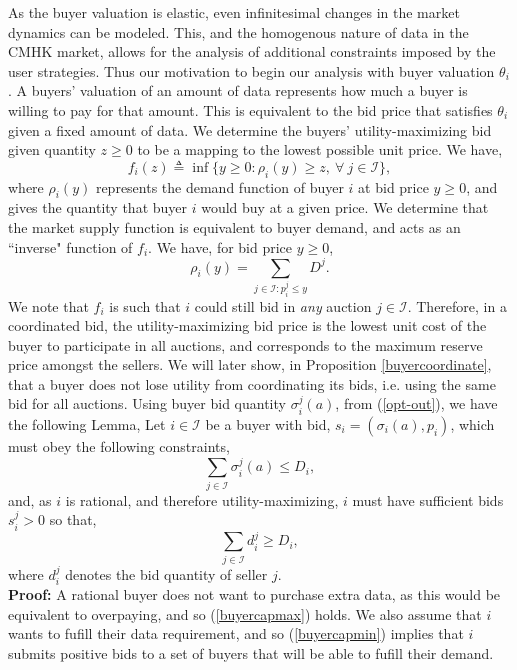 \documentclass[12pt]{article}
\theoremstyle{definition}
\newcommand{\mcI}{\mathcal{I}}
\newcommand{\g}{\sigma}
\begin{document}
\begin{multicols}{2}
As the buyer valuation is elastic, even infinitesimal changes in the market dynamics can be
modeled. This, and the homogenous nature of data in the CMHK market, 
allows for the analysis of additional constraints imposed by the user
strategies. Thus our motivation to begin our analysis with buyer valuation $\theta_i$.
A buyers' valuation of an amount of data represents how much a buyer is willing
to pay for that amount. 
This is equivalent to the bid price that
satisfies $\theta_i$ given a fixed amount of data. We determine the
buyers' utility-maximizing bid given quantity $z\ge0$ to be a mapping to the lowest
possible unit price. We have,
\begin{equation}\label{buyerinversedemand}
    f_i(z) \triangleq \inf\big\lbrace y\ge 0:
        \rho_i(y) \ge z, \ \forall \ j \in \mcI\big\rbrace,
\end{equation}
where $\rho_i(y)$ represents the demand function of buyer $i$ at bid price
$y\ge 0$, and gives the quantity that buyer $i$ would buy at a given price.
We determine that the market supply function is equivalent to buyer demand, and 
acts as an ``inverse" function of $f_i$. We have, for bid price $y\ge 0$,
\begin{equation}\label{datasupply}
    \rho_i(y) = \sum_{j\in\mcI : p_i^j\le y} D^j.
\end{equation}
We note that $f_i$ is such that
$i$ could still bid in \emph{any} auction $j\in\mcI$.
Therefore, in a coordinated bid, the utility-maximizing bid price is the
lowest unit cost of the buyer to participate in all auctions, and corresponds to
the maximum reserve price amongst the sellers. We will later show, in Proposition
\ref{buyercoordinate}, that a buyer does not lose utility from coordinating its
bids, i.e. using the same bid for all auctions.
Using buyer bid quantity $\g_i^j(a)$, from (\ref{opt-out}), 
we have the following Lemma,
{
\label{buyerconstraints}
Let $i\in\mcI$ be a buyer with bid, $s_i = (\g_i(a), p_i)$, which must obey
the following constraints,
\begin{equation}\label{buyercapmax}
    \sum_{j\in\mcI} \g^j_i(a) \le D_i,
\end{equation}
and, as $i$ is rational, and therefore utility-maximizing, $i$ must have
sufficient bids $s_i^j > 0$ so that,
\begin{equation}\label{buyercapmin}
    \sum_{j\in\mcI} d^j_i \ge D_i,
\end{equation}
where $d_i^j$ denotes the bid quantity of seller $j$.
}\\
\textbf{Proof:}
A rational buyer does not want to purchase extra data, as this would be
equivalent to overpaying, and so (\ref{buyercapmax}) holds. We also assume that
$i$ wants to fufill their data requirement, and so (\ref{buyercapmin}) implies
that $i$ submits positive bids to a set of buyers that will be able to fufill
their demand.


\end{multicols}
\end{document}
